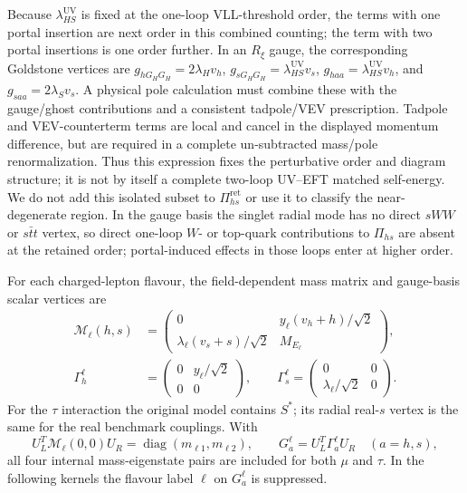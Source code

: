 \documentclass[12pt,a4paper]{article}
\begin{document}
Because \(\lambda_{HS}^{\mathrm{UV}}\) is fixed at the one-loop VLL-threshold order, the terms with one portal insertion are next order in this combined counting; the term with two portal insertions is one order further. In an \(R_\xi\) gauge, the corresponding Goldstone vertices are \(g_{hG_HG_H}=2\lambda_Hv_h\), \(g_{sG_HG_H}=\lambda_{HS}^{\mathrm{UV}}v_s\), \(g_{haa}=\lambda_{HS}^{\mathrm{UV}}v_h\), and \(g_{saa}=2\lambda_Sv_s\). A physical pole calculation must combine these with the gauge/ghost contributions and a consistent tadpole/VEV prescription. Tadpole and VEV-counterterm terms are local and cancel in the displayed momentum difference, but are required in a complete un-subtracted mass/pole renormalization. Thus this expression fixes the perturbative order and diagram structure; it is not by itself a complete two-loop UV--EFT matched self-energy. We do not add this isolated subset to \(\Pi_{hs}^{\mathrm{ret}}\) or use it to classify the near-degenerate region. In the gauge basis the singlet radial mode has no direct \(sWW\) or \(s\bar t t\) vertex, so direct one-loop \(W\)- or top-quark contributions to \(\Pi_{hs}\) are absent at the retained order; portal-induced effects in those loops enter at higher order.

For each charged-lepton flavour, the field-dependent mass matrix and gauge-basis scalar vertices are
\[
\begin{aligned}
\mathcal M_\ell(h,s)&=
\begin{pmatrix}
0&y_\ell(v_h+h)/\sqrt2\\
\lambda_\ell(v_s+s)/\sqrt2&M_{E_\ell}
\end{pmatrix},\\[3pt]
\Gamma_h^\ell&=
\begin{pmatrix}0&y_\ell/\sqrt2\\0&0\end{pmatrix},
\qquad
\Gamma_s^\ell=
\begin{pmatrix}0&0\\\lambda_\ell/\sqrt2&0\end{pmatrix}.
\end{aligned}
\]
For the \(\tau\) interaction the original model contains \(S^*\); its radial real-\(s\) vertex is the same for the real benchmark couplings. With
\[
U_L^T\mathcal M_\ell(0,0)U_R
=\operatorname{diag}(m_{\ell1},m_{\ell2}),
\qquad
G_a^\ell=U_L^T\Gamma_a^\ell U_R\quad(a=h,s),
\]
all four internal mass-eigenstate pairs are included for both \(\mu\) and \(\tau\). In the following kernels the flavour label \(\ell\) on \(G_a^\ell\) is suppressed.
\end{document}
